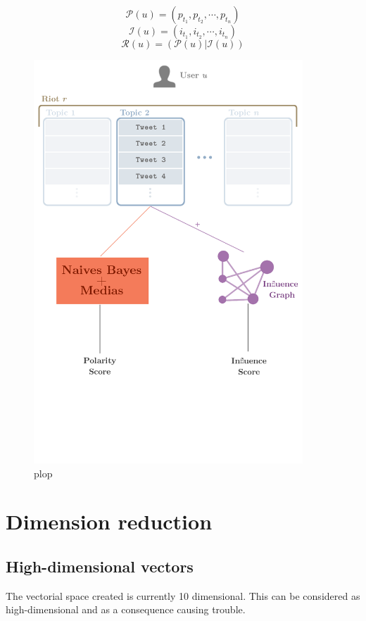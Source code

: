 \documentclass[a4paper,12pt]{report}
\begin{document}
$$ \mathcal{P}(u) = (p_{t_1},p_{t_2},\cdots,p_{t_n}) $$
$$ \mathcal{I}(u) = (i_{t_1},i_{t_2},\cdots,i_{t_n}) $$
$$ \mathcal{R}(u) = (\mathcal{P}(u) | \mathcal{I}(u)) $$


\newpage

\begin{figure}[H]
\centering
\includegraphics[width=0.9\textwidth]{images/diags/chain.png}
\caption{plop}
\end{figure}

\newpage

\section{Dimension reduction}
\subsection{High-dimensional vectors}
The vectorial space created is currently 10 dimensional. This can be considered as high-dimensional and as a consequence causing trouble. 
\end{document}
